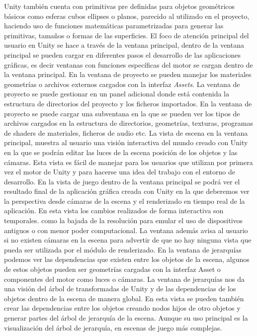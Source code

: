 \documentclass[a4paper]{book}
\begin{document}
Unity también cuenta con primitivas pre definidas para objetos geométricos básicos como esferas cubos
ellipses o planos, parecido al utilizado en el proyecto, haciendo uso de funciones matemáticas parametrizadas
para generar las primitivas, tamaños o formas de las superficies. El foco de atención principal del usuario en Unity
se hace a través de la ventana principal, dentro de la ventana principal se pueden cargar en diferentes pasos el desarrollo
de las aplicaciones gráficas, es decir ventanas con funciones específicas del motor se cargan dentro de la ventana principal. En la
ventana de proyecto se pueden manejar los materiales geometrías o archivos externos cargados con la interfaz \textit{Assets}. La ventana de
proyecto se puede gestionar en un panel adicional donde está contenida la estructura de directorios del proyecto y los ficheros
importados. En la ventana de proyecto se puede cargar una subventana en la que se pueden ver los tipos de archivos cargados en la
estructura de directorios, geometrías, texturas, programas de shaders de materiales, ficheros de audio etc. La vista de escena en la ventana
principal, muestra al usuario una visión interactiva del mundo creado con Unity en la que se podrán editar las luces de la escena posición
de los objetos y las cámaras. Esta vista es fácil de manejar para los usuarios que utilizan por primera vez el motor de Unity y para
hacerse una idea del trabajo con el entorno de desarrollo. En la vista de juego dentro de la ventana principal se podrá ver el resultado
final de la aplicación gráfica creada con Unity en la que deberemos ver la perspectiva desde cámaras de la escena y el renderizado en tiempo
real de la aplicación. En esta vista los cambios realizados de forma interactiva son temporales. como la bajada de la resolución para
emular el uso de dispositivos antiguos o con menor poder computacional. La ventana además avisa al usuario si no existen cámaras en la
escena para advertir de que no hay ninguna vista que pueda ser utilizada por el módulo de renderizado. En la ventana de jerarquías podemos
ver las dependencias que existen entre los objetos de la escena, algunos de estos objetos pueden ser geometrías cargadas con la interfaz
Asset o componentes del motor como luces o cámaras.  La ventana de jerarquías nos da una visión del árbol de transformadas de Unity y de
las dependencias de los objetos dentro de la escena de manera global. En esta vista se pueden también crear las dependencias entre
los objetos creando nodos hijos de otro objetos y generar partes del árbol de jerarquía de la escena. Aunque
su uso principal es la visualización del árbol de jerarquía, en escenas de juego más complejas.
\end{document}
